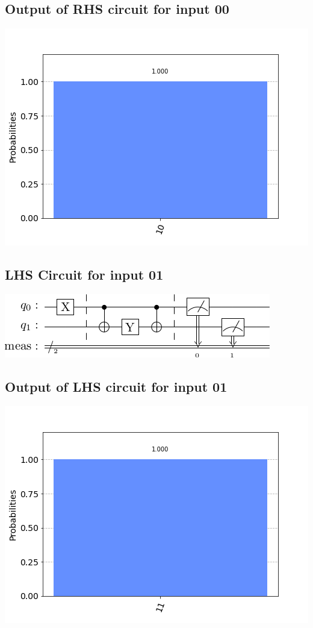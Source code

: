 \documentclass[a4paper]{article}
\begin{document}
\begin{answer}[Qeusiton 1 b (c)]
        \subsection*{Output of RHS circuit for input 00}
        \includegraphics[scale = 0.5]{c200-out.png}
        \subsection*{LHS Circuit for input 01}
        \includegraphics[scale=0.5]{c101.png}
        \subsection*{Output of LHS circuit for input 01}
        \includegraphics[scale = 0.5]{c101-out.png}

\end{answer}
\end{document}
